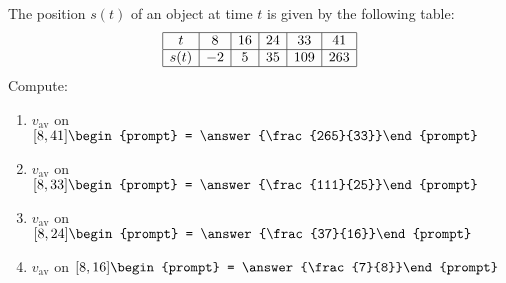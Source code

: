 \documentclass{ximera}
\author{Bart Snapp}
\begin{document}
\begin{exercise}
The position $s(t)$ of an object at time $t$ is given by the following table:
\[
\begin{array}{|c|c|c|c|c|c|}\hline
t &8 &16 &24 &33 &41 \\ \hline
s(t) &-2 &5 & 35&109 & 263\\ \hline
\end{array}
\]
Compute:
\begin{enumerate}
\item $v_{\mathrm{av}}$ on $[8,41]\begin{prompt} = \answer{\frac{265}{33}}\end{prompt}$
\item $v_{\mathrm{av}}$ on $[8,33]\begin{prompt} = \answer{\frac{111}{25}}\end{prompt}$
\item $v_{\mathrm{av}}$ on $[8,24]\begin{prompt} = \answer{\frac{37}{16}}\end{prompt}$
\item $v_{\mathrm{av}}$ on $[8,16]\begin{prompt} = \answer{\frac{7}{8}}\end{prompt}$
\end{enumerate}
\end{exercise}
\end{document}

